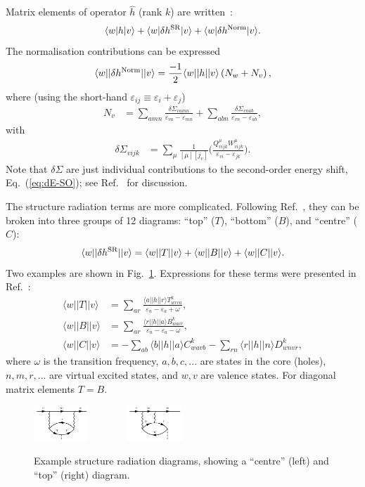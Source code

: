 \documentclass[10pt,twocolumn,a4paper]{article}%
\newcommand{\bra}[1]{\ensuremath{\langle #1|}}	%
\newcommand{\ket}[1]{\ensuremath{|#1\rangle}}	%
\newcommand{\be}{\begin{equation}}
\newcommand{\ee}{\end{equation}}
\def\en{\ensuremath{\varepsilon}}
\newcommand{\w}{\ensuremath{\omega}}
\begin{document}
Matrix elements of operator $\hat h$ (rank $k$) are written~\cite{Blundell1987,Dzuba1987jpbRPA}:
\be
\bra{w}h\ket{v} + \bra{w}\delta h^{\rm SR}\ket{v}+\bra{w}\delta h^{\rm Norm}\ket{v}.
\ee
The normalisation contributions can be expressed
\be
\bra{w}|\delta h^{\rm Norm}|\ket{v} = \frac{-1}{2}\bra{w}|h|\ket{v}\left(N_{w}  +  N_{v}\right),
\ee
where (using the short-hand $\en_{ij}\equiv\en_i+\en_j$)
\begin{align}
N_v &=
 \sum_{amn} \frac{\delta\Sigma_{vamn}}{\en_{va} - \en_{mn}}
+\sum_{abn}\frac{\delta\Sigma_{vnab}}{\en_{vn}-\en_{ab}} ,
\end{align}
with
\begin{align}
\delta\Sigma_{vijk} &=\sum_\mu \frac{1}{[\mu][j_v]}\Bigg(
\frac{Q^\mu_{vijk}W^\mu_{vijk}}{\en_{vi} - \en_{jk}}
 \Bigg).
\end{align}
Note that $\delta\Sigma$ are just individual contributions to the second-order energy shift, Eq.~(\ref{eq:dE-SO});
see Ref.~\cite{Dzuba1987jpbRPA} for discussion.








The structure radiation terms are more complicated.
Following Ref.~\cite{JohLiuSap96}, they can be broken into three groups of 12 diagrams: ``top'' ($T$), ``bottom'' ($B$), and ``centre'' ($C$):
\[
\bra{w}|\delta h^{\rm SR}|\ket{v} = \bra{w}|T|\ket{v} + \bra{w}|B|\ket{v} + \bra{w}|C|\ket{v}.
\]
Two examples are shown in Fig.~\ref{fig:SR-example}.
Expressions for these terms were presented in Ref.~\cite{JohLiuSap96}:
\begin{align}
\bra{w}|T|\ket{v} &= \sum_{ar} \frac{\bra{a}|h|\ket{r} T^k_{wrva}}{\en_n - \en_a + \w},\\
\bra{w}|B|\ket{v} &= \sum_{ar} \frac{\bra{r}|h|\ket{a} B^k_{wavr}}{\en_n - \en_a - \w},\\
\bra{w}|C|\ket{v} &= -\sum_{ab} {\bra{b}|h|\ket{a} C^{k}_{wavb}} - \sum_{rn} {\bra{r}|h|\ket{n} D^{k}_{wnvr}},
\end{align}
where $\omega$ is the transition frequency,
$a,b,c,...$ are states in the core (holes), $n,m,r,...$ are virtual excited states, and $w,v$ are valence states.
For diagonal matrix elements $T=B$.




\begin{figure}%
\centering\tiny
\includegraphics[width=0.185\textwidth]{img/sr/SR_exC}~~~~~~~
\includegraphics[width=0.185\textwidth]{img/sr/SR_exT}
\caption{\small Example structure radiation diagrams, showing a ``centre'' (left) and ``top'' (right) diagram.\label{fig:SR-example}}
\end{figure}
\end{document}

